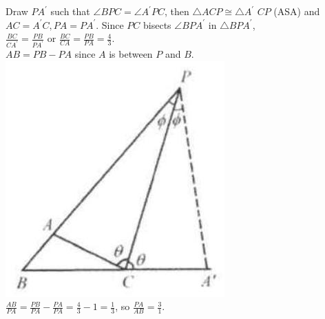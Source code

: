 \documentclass{article}
\begin{document}
Draw \(P A^{\prime}\) such that \(\angle B P C=\angle A^{\prime} P C\), then \(\triangle A C P \cong \triangle A^{\prime}\) \(C P\) (ASA) and \(A C=A^{\prime} C, P A=P A^{\prime}\). Since \(P C\) bisects \(\angle B P A^{\prime}\) in \(\triangle B P A^{\prime}\),\\
\(\frac{B C}{C A^{\prime}}=\frac{P B}{P A^{\prime}}\) or \(\frac{B C}{C A}=\frac{P B}{P A}=\frac{4}{3}\).\\
\(A B=P B-P A\) since \(A\) is between \(P\) and \(B\).\\
\centering
\includegraphics[width=\textwidth]{images/056(3).jpg}\\
\(\frac{A B}{P A}=\frac{P B}{P A}-\frac{P A}{P A}=\frac{4}{3}-1=\frac{1}{3}\), so \(\frac{P A}{A B}=\frac{3}{1}\).\\
\end{document}
